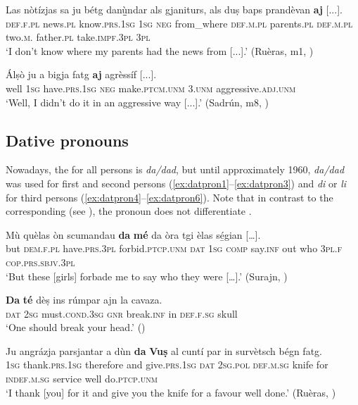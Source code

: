 \ea
\label{ex:aj:6}
\gll    Las nòtízjas sa ju bétg dan{\`u̱̱}ndar als gjaniturs, als duṣ baps prandèvan \textbf{aj} [...].\\
\textsc{def.f.pl} news.\textsc{pl} know.\textsc{prs.1sg} \textsc{1sg} \textsc{neg} from\_where \textsc{def.m.pl} parents.\textsc{pl} \textsc{def.m.pl} two.\textsc{m.} father.\textsc{pl} take.\textsc{impf.3pl} \textsc{3pl}\\
\glt `I don’t know where my parents had the news from [...].' (Ruèras, m1, )
\z

\ea
\label{ex:aj:8}
\gll  Álṣò ju a bigja fatg \textbf{aj} agrèssíf [...].\\
well \textsc{1sg} have.\textsc{prs.1sg} \textsc{neg} make.\textsc{ptcm.unm} \textsc{3.unm} aggressive.\textsc{adj.unm}\\
\glt `Well, I didn’t do it in an aggressive way [...].' (Sadrún, m8, )
\z

\subsection{Dative pronouns}\label{sec:3.6.1}
Nowadays, the  for all persons is \textit{da/dad}, but until approximately 1960, \textit{da/dad} was used for first and second persons (\ref{ex:datpron1}--\ref{ex:datpron3}) and \textit{di} or \textit{li} for third persons (\ref{ex:datpron4}--\ref{ex:datpron6}). Note that in contrast to the corresponding  (see ), the pronoun does not differentiate .

\ea\label{ex:datpron1}
\gll    Mù quèlas òn scumandau \textbf{da} \textbf{mé} da  òra tgi èlas s{\'e̱}gian […].\\
     but \textsc{dem.f.pl} have.\textsc{prs.3pl} forbid.\textsc{ptcp.unm} \textsc{dat} \textsc{1sg} \textsc{comp} say.\textsc{inf} out who \textsc{3pl.f} \textsc{cop.prs.sbjv.3pl} \\
\glt `But these [girls] forbade me to say who they were […].' (Surajn, \citealt[128f.]{Büchli1966})
\z

\ea\label{ex:datpron2}
\gll   \textbf{Da} \textbf{té} dèṣ ins rúmpar ajn la cavaza.\\
\textsc{dat} \textsc{2sg} must.\textsc{cond.3sg} \textsc{gnr} break.\textsc{inf} in \textsc{def.f.sg} skull\\
\glt `One should break your head.' ()
\z

\ea\label{ex:datpron3}
\gll  Ju angrázja parsjantar a dùn \textbf{da} \textbf{Vuṣ} al cuntí par in survètsch bégn fatg.\\
\textsc{1sg} thank.\textsc{prs.1sg} therefore and give.\textsc{prs.1sg} \textsc{dat} \textsc{2sg.pol} \textsc{def.m.sg} knife for \textsc{indef.m.sg} service well do.\textsc{ptcp.unm}\\
\glt `I thank [you] for it and give you the knife for a favour well done.' (Ruèras, \citealt[65]{Büchli1966})
\z


